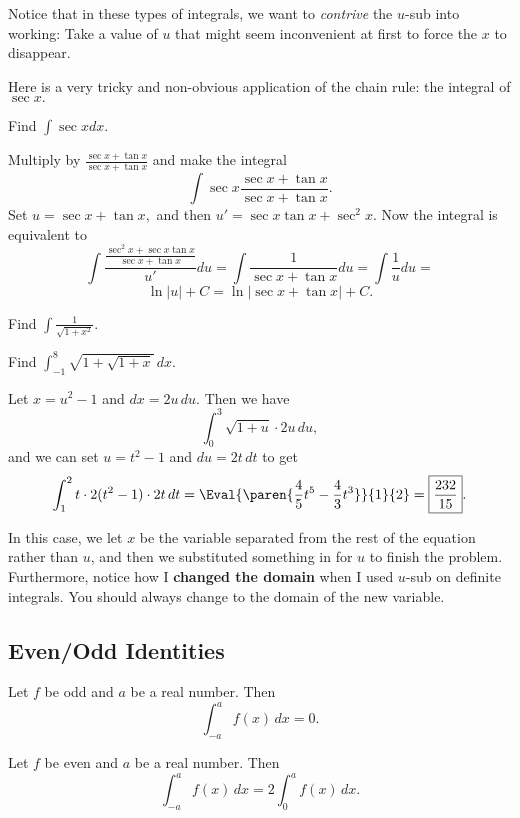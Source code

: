 \documentclass[mast]{lucky}
\begin{document}
Notice that in these types of integrals, we want to \emph{contrive} the $u$-sub into working: Take a value of $u$ that might seem inconvenient at first to force the $x$ to disappear.

Here is a very tricky and non-obvious application of the chain rule: the integral of $\sec x.$

\begin{exam}[sec x]
Find $\int \sec x dx.$
\end{exam}

\begin{sol}
Multiply by $\frac{\sec x+ \tan x}{\sec x + \tan x}$ and make the integral
\[\int \sec x \frac{\sec x + \tan x}{\sec x + \tan x}.\]
Set $u=\sec x + \tan x,$ and then $u'=\sec x \tan x + \sec^2 x.$ Now the integral is equivalent to
\[\int \frac{\frac{\sec^2 x + \sec x \tan x}{\sec x + \tan x}}{u'}du=\int \frac{1}{\sec x + \tan x}du=\int \frac{1}{u} du =\]
\[\ln|u|+C=\ln|\sec x+\tan x|+C.\]
\end{sol}

\begin{exer}
Find $\int \frac{1}{\sqrt{1+x^2}}.$
\end{exer}

\begin{exam}
Find $\int_{-1}^8\sqrt{1+\sqrt{1+x}}\,dx$.
\end{exam}

\begin{sol}
Let $x=u^2-1$ and $dx=2u\,du$. Then we have
$$\int_0^3\sqrt{1+u}\cdot 2u\,du,$$
and we can set $u=t^2-1$ and $du=2t\,dt$ to get
$$\int_1^2  t\cdot2(t^2-1)\cdot 2t\,dt = \Eval{\paren{\frac{4}{5}t^5-\frac{4}{3}t^3}}{1}{2}=\boxed{\frac{232}{15}}.$$
\end{sol}

\begin{remark}
In this case, we let $x$ be the variable separated from the rest of the equation rather than $u$, and then we substituted something in for $u$ to finish the problem. Furthermore, notice how I \textbf{changed the domain} when I used $u$-sub on definite integrals. You should always change to the domain of the new variable.
\end{remark}

\subsection{Even/Odd Identities}
\begin{theo}
Let $f$ be odd and $a$ be a real number. Then
$$\int_{-a}^a f(x)\,dx=0.$$
\end{theo}
\begin{theo}
Let $f$ be even and $a$ be a real number. Then
$$\int_{-a}^a f(x)\,dx=2\int_0^a f(x)\,dx.$$
\end{theo}
\end{document}
